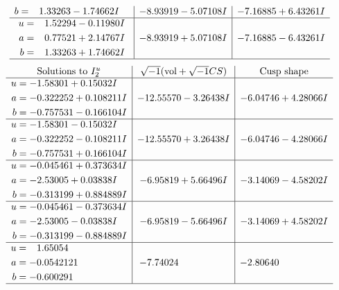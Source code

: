 \documentclass[1p]{elsarticle_modified}
\theoremstyle{definition}
\newcommand{\I}{\sqrt{-1}}
\begin{document}
$$\begin{array}{c|c|c}
\begin{aligned}
b &= \phantom{-}1.33263 - 1.74662 I\end{aligned}
 & -8.93919 - 5.07108 I & -7.16885 + 6.43261 I \\ \hline\begin{aligned}
u &= \phantom{-}1.52294 - 0.11980 I \\
a &= \phantom{-}0.77521 + 2.14767 I \\
b &= \phantom{-}1.33263 + 1.74662 I\end{aligned}
 & -8.93919 + 5.07108 I & -7.16885 - 6.43261 I\\
 \hline 
 \end{array}$$\newpage$$\begin{array}{c|c|c}  
\text{Solutions to }I^u_{2}& \I (\text{vol} + \sqrt{-1}CS) & \text{Cusp shape}\\
 \hline 
\begin{aligned}
u &= -1.58301 + 0.15032 I \\
a &= -0.322252 + 0.108211 I \\
b &= -0.757531 - 0.166104 I\end{aligned}
 & -12.55570 - 3.26438 I & -6.04746 + 4.28066 I \\ \hline\begin{aligned}
u &= -1.58301 - 0.15032 I \\
a &= -0.322252 - 0.108211 I \\
b &= -0.757531 + 0.166104 I\end{aligned}
 & -12.55570 + 3.26438 I & -6.04746 - 4.28066 I \\ \hline\begin{aligned}
u &= -0.045461 + 0.373634 I \\
a &= -2.53005 + 0.03838 I \\
b &= -0.313199 + 0.884889 I\end{aligned}
 & -6.95819 + 5.66496 I & -3.14069 - 4.58202 I \\ \hline\begin{aligned}
u &= -0.045461 - 0.373634 I \\
a &= -2.53005 - 0.03838 I \\
b &= -0.313199 - 0.884889 I\end{aligned}
 & -6.95819 - 5.66496 I & -3.14069 + 4.58202 I \\ \hline\begin{aligned}
u &= \phantom{-}1.65054\phantom{ +0.000000I} \\
a &= -0.0542121\phantom{ +0.000000I} \\
b &= -0.600291\phantom{ +0.000000I}\end{aligned}
 & -7.74024\phantom{ +0.000000I} & -2.80640\phantom{ +0.000000I}\\
 \hline 
 \end{array}$$\newpage
\end{document}
